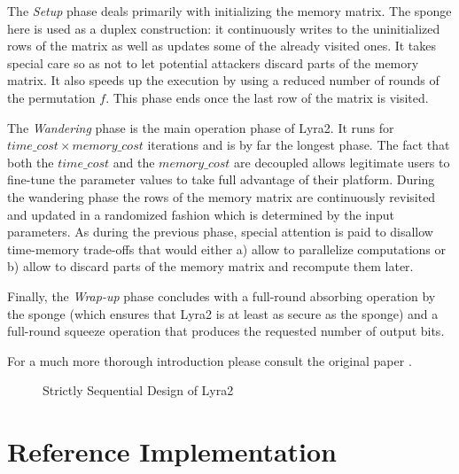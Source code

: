 The \emph{Setup} phase deals primarily with initializing the memory matrix. The sponge here is used as a duplex construction: it continuously writes to the uninitialized rows of the matrix as well as updates some of the already visited ones. It takes special care so as not to let potential attackers discard parts of the memory matrix. It also speeds up the execution by using a reduced number of rounds of the permutation \(f\). This phase ends once the last row of the matrix is visited.

The \emph{Wandering} phase is the main operation phase of Lyra2. It runs for \(time\_cost \times memory\_cost\) iterations and is by far the longest phase. The fact that both the \(time\_cost\) and the \(memory\_cost\) are decoupled allows legitimate users to fine-tune the parameter values to take full advantage of their platform. During the wandering phase the rows of the memory matrix are continuously revisited and updated in a randomized fashion which is determined by the input parameters. As during the previous phase, special attention is paid to disallow time-memory trade-offs that would either a) allow to parallelize computations or b) allow to discard parts of the memory matrix and recompute them later.

Finally, the \emph{Wrap-up} phase concludes with a full-round absorbing operation by the sponge (which ensures that Lyra2 is at least as secure as the sponge) and a full-round squeeze operation that produces the requested number of output bits.

For a much more thorough introduction please consult the original paper \cite{andrade:2016:lyra2,marcos:2015:lyra2}.

\begin{figure}[H]
\centering
  \caption{Strictly Sequential Design of Lyra2}
  \label{fig:basic-structure-lyra2}
\end{figure}

\section{Reference Implementation}
\label{sec:reference-implementation}

